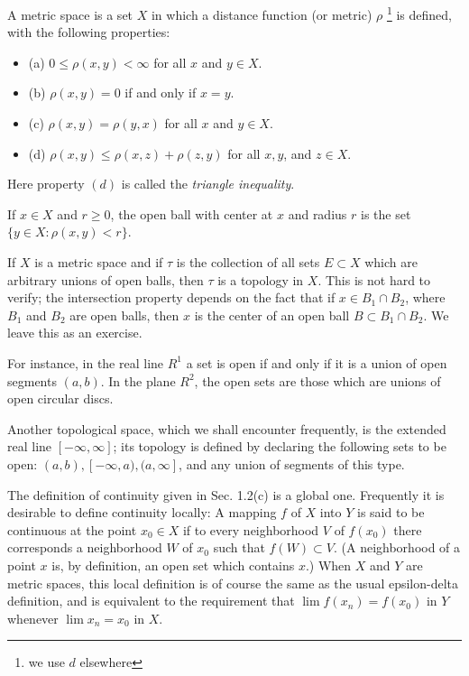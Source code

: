 \documentclass[11pt]{article}
\begin{document}
A metric space is a set \(X\) in which a distance function (or metric) \(\rho\) \footnote{we use \(d\) elsewhere} is defined, with the following properties:

\begin{itemize}
\item (a) \(0 \leq \rho(x, y)<\infty\) for all \(x\) and \(y \in X\).
\item (b) \(\rho(x, y)=0\) if and only if \(x=y\).
\item (c) \(\rho(x, y)=\rho(y, x)\) for all \(x\) and \(y \in X\).
\item (d) \(\rho(x, y) \leq \rho(x, z)+\rho(z, y)\) for all \(x, y\), and \(z \in X\).
\end{itemize}

Here property \((d)\) is called the \emph{triangle inequality}.

If \(x \in X\) and \(r \geq 0\), the open ball with center at \(x\) and radius \(r\) is the set \(\{y \in X: \rho(x, y)<r\}\).

If \(X\) is a metric space and if \(\tau\) is the collection of all sets \(E \subset X\) which are arbitrary unions of open balls, then \(\tau\) is a topology in \(X\). This is not hard to verify; the intersection property depends on the fact that if \(x \in B_1 \cap B_2\), where \(B_1\) and \(B_2\) are open balls, then \(x\) is the center of an open ball \(B \subset B_1 \cap B_2\). We leave this as an exercise.

For instance, in the real line \(R^1\) a set is open if and only if it is a union of open segments \((a, b)\). In the plane \(R^2\), the open sets are those which are unions of open circular discs.

Another topological space, which we shall encounter frequently, is the extended real line \([-\infty, \infty]\); its topology is defined by declaring the following sets to be open: \((a, b),[-\infty, a),(a, \infty]\), and any union of segments of this type.

The definition of continuity given in Sec. 1.2(c) is a global one. Frequently it is desirable to define continuity locally: A mapping \(f\) of \(X\) into \(Y\) is said to be continuous at the point \(x_0 \in X\) if to every neighborhood \(V\) of \(f\left(x_0\right)\) there corresponds a neighborhood \(W\) of \(x_0\) such that \(f(W) \subset V\).
(A neighborhood of a point \(x\) is, by definition, an open set which contains \(x\).)
When \(X\) and \(Y\) are metric spaces, this local definition is of course the same as the usual epsilon-delta definition, and is equivalent to the requirement that \(\lim f\left(x_n\right)=f\left(x_0\right)\) in \(Y\) whenever \(\lim x_n=x_0\) in \(X\).
\end{document}
